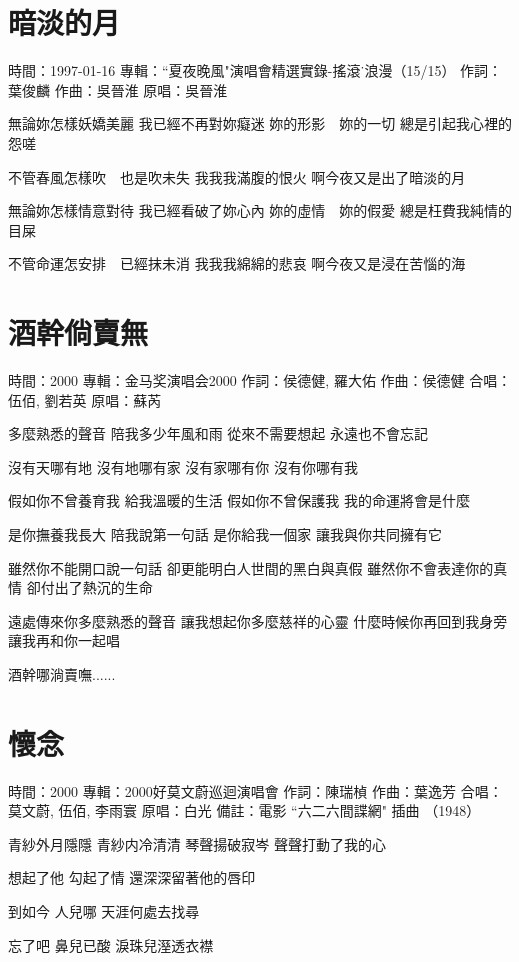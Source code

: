 \documentclass[UTF8,a4paper,oneside,twocolumn,12pt]{ctexbook}
\newcommand{\infopair}[2]{\textbullet #1：#2}
\newcommand{\zc}[1][伍佰]{\infopair{作詞}{#1}}
\newcommand{\zq}[1][伍佰]{\infopair{作曲}{#1}}
\newcommand{\zj}[1]{\infopair{專輯}{#1}}
\newcommand{\yc}[1]{\infopair{原唱}{#1}}
\newcommand{\sj}[1]{\infopair{時間}{#1}}
\newcommand{\bz}[1]{\infopair{備註}{#1}}
\newenvironment{info}{\begin{flushleft}\kaishu
	}
	{\end{flushleft}\normalsize\yahei\par}
\newenvironment{lyric}{
	}
{}
\begin{document}
\section{暗淡的月}
\begin{info}
	\sj{1997-01-16}
	\zj{``夏夜晚風"演唱會精選實錄-搖滾˙浪漫（15/15）}
	\zc[葉俊麟]
	\zq[吳晉淮]
	\yc{吳晉淮}
\end{info}
\begin{lyric}
	無論妳怎樣妖嬌美麗
	我已經不再對妳癡迷
	妳的形影　妳的一切
	總是引起我心裡的怨嗟

	不管春風怎樣吹　也是吹未失
	我我我滿腹的恨火
	啊今夜又是出了暗淡的月

	無論妳怎樣情意對待
	我已經看破了妳心內
	妳的虛情　妳的假愛
	總是枉費我純情的目屎

	不管命運怎安排　已經抹未消
	我我我綿綿的悲哀
	啊今夜又是浸在苦惱的海
\end{lyric}

\section{酒幹倘賣無}
\begin{info}
	\sj{2000}
	\zj{金马奖演唱会2000}
	\zc[侯德健, 羅大佑]
	\zq[侯德健]
	\infopair{合唱}{伍佰, 劉若英}
	\yc{蘇芮}
\end{info}
\begin{lyric}
	多麼熟悉的聲音
	陪我多少年風和雨
	從來不需要想起
	永遠也不會忘記

	沒有天哪有地
	沒有地哪有家
	沒有家哪有你
	沒有你哪有我

	假如你不曾養育我
	給我溫暖的生活
	假如你不曾保護我
	我的命運將會是什麼

	是你撫養我長大
	陪我說第一句話
	是你給我一個家
	讓我與你共同擁有它

	雖然你不能開口說一句話
	卻更能明白人世間的黑白與真假
	雖然你不會表達你的真情
	卻付出了熱沉的生命

	遠處傳來你多麼熟悉的聲音
	讓我想起你多麼慈祥的心靈
	什麼時候你再回到我身旁
	讓我再和你一起唱

	酒幹哪淌賣嘸......
\end{lyric}

\section{懷念}
\begin{info}
	\sj{2000}
	\zj{2000好莫文蔚巡迴演唱會}
	\zc[陳瑞楨]
	\zq[葉逸芳]
	\infopair{合唱}{莫文蔚, 伍佰, 李雨寰}
	\yc{白光}
	\bz{電影 ``六二六間諜網" 插曲 （1948）}
\end{info}
\begin{lyric}
	青紗外月隱隱 青紗内冷清清
	琴聲揚破寂岑 聲聲打動了我的心

	想起了他 勾起了情
	還深深留著他的唇印

	到如今 人兒哪
	天涯何處去找尋

	忘了吧 鼻兒已酸
	淚珠兒溼透衣襟
\end{lyric}
\end{document}
